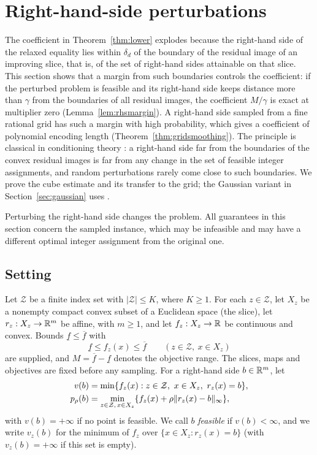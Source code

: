 \section{Right-hand-side perturbations}\label{sec:perturbation}
The coefficient in Theorem~\ref{thm:lower} explodes because the
right-hand side of the relaxed equality lies within $\delta_d$ of the
boundary of the residual image of an improving slice, that is, of the
set of right-hand sides attainable on that slice. This section shows
that a margin from such boundaries controls the coefficient: if the
perturbed problem is feasible and its right-hand side keeps distance more
than $\gamma$ from the boundaries of all residual images, the coefficient
$M/\gamma$ is exact at multiplier zero (Lemma~\ref{lem:rhsmargin}). A right-hand side sampled from a fine
rational grid has such a margin with high probability, which gives a
coefficient of polynomial encoding length
(Theorem~\ref{thm:gridsmoothing}). The principle is classical in
conditioning theory \citep{DunaganSpielmanTeng2011,BuergisserAmelunxen2012}:
a right-hand side far from the boundaries of the convex residual images
is far from any change in the set of feasible integer assignments, and
random perturbations rarely come close to such boundaries. We prove the
cube estimate and its transfer to the grid; the Gaussian variant in
Section~\ref{sec:gaussian} uses \citet[Lemma~2.3.4]{DunaganSpielmanTeng2011}.

Perturbing the right-hand side changes the problem. All guarantees in
this section concern the sampled instance, which may be infeasible and
may have a different optimal integer assignment from the original one.

\subsection{Setting}\label{sec:perturbation-setting}
Let $\mathcal Z$ be a finite index set with $|\mathcal Z|\le K$, where
$K\ge1$. For each $z\in\mathcal Z$, let $X_z$ be a nonempty compact
convex subset of a Euclidean space (the slice), let
$r_z:X_z\to\mathbb R^m$ be affine, with $m\ge1$, and let $f_z:X_z\to\mathbb R$ be
continuous and convex. Bounds $\underline f\le\overline f$ with
\[
 \underline f\le f_z(x)\le\overline f\qquad(z\in\mathcal Z,\ x\in X_z)
\]
are supplied, and $M=\overline f-\underline f$ denotes the objective range.
The slices, maps and objectives are fixed before any sampling. For a
right-hand side $b\in\mathbb R^m$, let
\begin{equation}\label{eq:rhsmodel}
 \begin{aligned}
 v(b)&=\min\{f_z(x):z\in\mathcal Z,\ x\in X_z,\ r_z(x)=b\},\\
 p_\rho(b)&=\min_{z\in\mathcal Z,\,x\in X_z}
             \{f_z(x)+\rho\lVert r_z(x)-b\rVert_\infty\},
 \end{aligned}
\end{equation}
with $v(b)=+\infty$ if no point is feasible. We call $b$ \emph{feasible}
if $v(b)<\infty$, and we write $v_z(b)$ for the minimum of $f_z$ over
$\{x\in X_z:r_z(x)=b\}$ (with $v_z(b)=+\infty$ if this set is empty).

